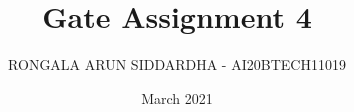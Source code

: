 \documentclass[journal,12pt,twocolumn]{IEEEtran}
\date{March 2021}
\DeclareMathOperator*{\Res}{Res}
\begin{document}
\newcommand{\multlinecomment}[1]{\directlua{-- #1}}
\newcommand{\BEQA}{\begin{eqnarray}}
\newcommand{\EEQA}{\end{eqnarray}}
\newcommand{\define}{\stackrel{\triangle}{=}}

\raggedbottom
\setlength{\parindent}{0pt}
\providecommand{\mbf}{\mathbf}
\providecommand{\pr}[1]{\ensuremath{\Pr\left(#1\right)}}
\providecommand{\qfunc}[1]{\ensuremath{Q\left(#1\right)}}
\providecommand{\fn}[1]{\ensuremath{f\left(#1\right)}}
\providecommand{\e}[1]{\ensuremath{E\left(#1\right)}}
\providecommand{\sbrak}[1]{\ensuremath{{}\left[#1\right]}}
\providecommand{\lsbrak}[1]{\ensuremath{{}\left[#1\right.}}
\providecommand{\rsbrak}[1]{\ensuremath{{}\left.#1\right]}}
\providecommand{\brak}[1]{\ensuremath{\left(#1\right)}}
\providecommand{\lbrak}[1]{\ensuremath{\left(#1\right.}}
\providecommand{\rbrak}[1]{\ensuremath{\left.#1\right)}}
\providecommand{\cbrak}[1]{\ensuremath{\left\{#1\right\}}}
\providecommand{\lcbrak}[1]{\ensuremath{\left\{#1\right.}}
\providecommand{\rcbrak}[1]{\ensuremath{\left.#1\right\}}}
\theoremstyle{remark}
\newtheorem{rem}{Remark}
\newcommand{\sgn}{\mathop{\mathrm{sgn}}}
\providecommand{\abs}[1]{\vert#1\vert}
\providecommand{\res}[1]{\Res\displaylimits_{#1}} 
\providecommand{\norm}[1]{\lVert#1\rVert}
\providecommand{\mtx}[1]{\mathbf{#1}}
\providecommand{\mean}[1]{E[ #1 ]}
\providecommand{\fourier}{\overset{\mathcal{F}}{ \rightleftharpoons}}
\providecommand{\system}{\overset{\mathcal{H}}{ \longleftrightarrow}}
\newcommand{\solution}{\noindent \textbf{Solution: }}
\newcommand{\cosec}{\,\text{cosec}\,}
\providecommand{\dec}[2]{\ensuremath{\overset{#1}{\underset{#2}{\gtrless}}}}
\newcommand{\myvec}[1]{\ensuremath{\begin{pmatrix}#1\end{pmatrix}}}
\newcommand{\mydet}[1]{\ensuremath{\begin{vmatrix}#1\end{vmatrix}}}
\makeatletter
\vspace{3cm}
\title{Gate Assignment 4}
\author{RONGALA ARUN SIDDARDHA - AI20BTECH11019}
\maketitle
\newpage
\bigskip
\renewcommand{\thetable}{\theenumi}
\end{document}
